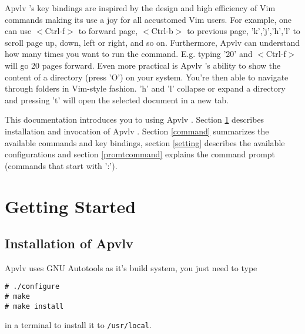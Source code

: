 \documentclass[a4paper,12pt]{article}
\newcommand{\apvlv}{\textsf{Apvlv{ }}}
\begin{document}
\apvlv's key bindings are inspired by the design and high efficiency of Vim commands making its use a joy for all accustomed Vim users. For example, one can use $<$Ctrl-f$>$ to forward page, $<$Ctrl-b$>$ to previous page, 'k','j','h','l' to scroll page up, down, left or right, and so on. 
Furthermore, \apvlv can understand how many times you want to run the command. E.g. typing '20' and  $<$Ctrl-f$>$ will go 20 pages forward.
Even more practical is \apvlv's ability to show the content of a directory (press 'O') on your system. You're then able to navigate through folders in Vim-style fashion. 'h' and 'l' collapse or expand a directory and pressing 't' will open the selected document in a new tab.


This documentation introduces you to using \apvlv. Section \ref{gettingstarted} describes installation and invocation of \apvlv. Section \ref{command} summarizes the available commands and key bindings, section \ref{setting} describes the available configurations and section \ref{promtcommand} explains the command prompt (commands that start with ':').


\newpage

\section{Getting Started}\label{gettingstarted}

\subsection{Installation of \apvlv}\label{sinstall}

\apvlv uses GNU Autotools as it's build system, you just need to type
\begin{verbatim}
# ./configure
# make
# make install
\end{verbatim}
in a terminal to install it to \texttt{/usr/local}.
\end{document}
